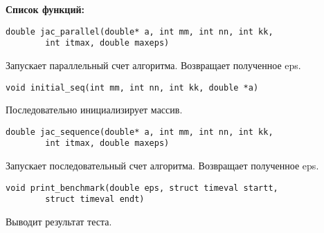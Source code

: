 \documentclass[a4paper,12pt,titlepage,draft]{article}
\begin{document}
\textbf{Список функций:}\\
\begin{verbatim}
double jac_parallel(double* a, int mm, int nn, int kk, 
        int itmax, double maxeps)
\end{verbatim}
Запускает параллельный счет алгоритма. Возвращает полученное eps.
\begin{verbatim}
void initial_seq(int mm, int nn, int kk, double *a)
\end{verbatim}
Последовательно инициализирует массив.
\begin{verbatim}
double jac_sequence(double* a, int mm, int nn, int kk, 
        int itmax, double maxeps)
\end{verbatim}
Запускает последовательный счет алгоритма. Возвращает полученное eps.
\begin{verbatim}
void print_benchmark(double eps, struct timeval startt, 
        struct timeval endt)
\end{verbatim}
Выводит результат теста.
\end{document}
